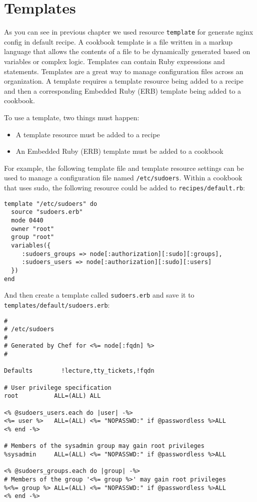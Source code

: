 \section{Templates}
\label{sec:cookbook-templates}

As you can see in previous chapter we used resource \lstinline!template! for generate nginx config in default recipe. A cookbook template is a file written in a markup language that allows the contents of a file to be dynamically generated based on variables or complex logic. Templates can contain Ruby expressions and statements. Templates are a great way to manage configuration files across an organization. A template requires a template resource being added to a recipe and then a corresponding Embedded Ruby (ERB) template being added to a cookbook.

To use a template, two things must happen:

\begin{itemize}
  \item A template resource must be added to a recipe
  \item An Embedded Ruby (ERB) template must be added to a cookbook
\end{itemize}

For example, the following template file and template resource settings can be used to manage a configuration file named \lstinline!/etc/sudoers!. Within a cookbook that uses sudo, the following resource could be added to \lstinline!recipes/default.rb!:

\begin{lstlisting}[label=lst:cookbook-templates1]
template "/etc/sudoers" do
  source "sudoers.erb"
  mode 0440
  owner "root"
  group "root"
  variables({
     :sudoers_groups => node[:authorization][:sudo][:groups],
     :sudoers_users => node[:authorization][:sudo][:users]
  })
end
\end{lstlisting}

And then create a template called \lstinline!sudoers.erb! and save it to \lstinline!templates/default/sudoers.erb!:

\begin{lstlisting}[label=lst:cookbook-templates2]
#
# /etc/sudoers
#
# Generated by Chef for <%= node[:fqdn] %>
#

Defaults        !lecture,tty_tickets,!fqdn

# User privilege specification
root          ALL=(ALL) ALL

<% @sudoers_users.each do |user| -%>
<%= user %>   ALL=(ALL) <%= "NOPASSWD:" if @passwordless %>ALL
<% end -%>

# Members of the sysadmin group may gain root privileges
%sysadmin     ALL=(ALL) <%= "NOPASSWD:" if @passwordless %>ALL

<% @sudoers_groups.each do |group| -%>
# Members of the group '<%= group %>' may gain root privileges
%<%= group %> ALL=(ALL) <%= "NOPASSWD:" if @passwordless %>ALL
<% end -%>
\end{lstlisting}


